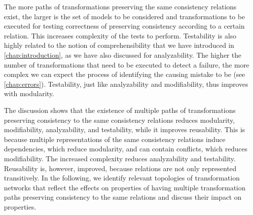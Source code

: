 \begin{properdescription}
    The more paths of transformations preserving the same consistency relations exist, the larger is the set of models to be considered and transformations to be executed for testing correctness of preserving consistency according to a certain relation.
    This increases complexity of the tests to perform.
    Testability is also highly related to the notion of comprehensibility that we have introduced in \autoref{chap:introduction}, as we have also discussed for analyzability. 
    The higher the number of transformations that need to be executed to detect a failure, the more complex we can expect the process of identifying the causing mistake to be (see \autoref{chap:errors}).
    Testability, just like analyzability and modifiability, thus improves with modularity.
\end{properdescription}

The discussion shows that the existence of multiple paths of transformations preserving consistency to the same consistency relations reduces modularity, modifiability, analyzability, and testability, while it improves reusability.
This is because multiple representations of the same consistency relations induce dependencies, which reduce modularity, and can contain conflicts, which reduces modifiability.
The increased complexity reduces analyzability and testability.
Reusability is, however, improved, because relations are not only represented transitively.
In the following, we identify relevant topologies of transformation networks that reflect the effects on properties of having multiple transformation paths preserving consistency to the same relations and discuss their impact on properties.
